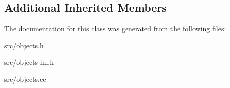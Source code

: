 \subsection*{Additional Inherited Members}


The documentation for this class was generated from the following files\+:\begin{DoxyCompactItemize}
\item 
src/objects.\+h\item 
src/objects-\/inl.\+h\item 
src/objects.\+cc\end{DoxyCompactItemize}
